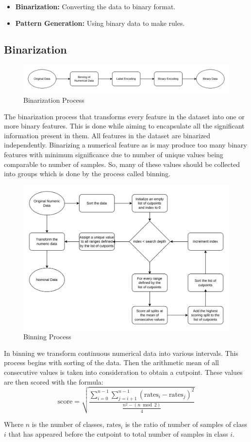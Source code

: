 \documentclass[pdflatex,sn-mathphys-num]{sn-jnl}%
\let\oldcaption\caption
\renewcommand{\caption}[1]{\oldcaption{\centering #1}}
\theoremstyle{thmstyleone}%
\theoremstyle{thmstyletwo}%
\theoremstyle{thmstylethree}%
\begin{document}
\begin{itemize}
    \item \textbf{Binarization:} Converting the data to binary format.
    \item \textbf{Pattern Generation:} Using binary data to make rules.
\end{itemize}


\subsection{Binarization}

\begin{figure}[ht!]
    \centering
    \includegraphics[width=\linewidth]{Binarization.drawio.png}
    \caption{Binarization Process}
    \label{fig:Binarization}
\end{figure}

The binarization process that transforms every feature in the dataset into one or more binary features.
This is done while aiming to encapsulate all the significant information present in them.
All features in the dataset are binarized independently.
Binarizing a numerical feature as is may produce too many binary features with minimum significance due to number of unique values being comparable to number of samples.
So, many of these values should be collected into groups which is done by the process called binning.

\begin{figure}[ht!]
    \centering
    \includegraphics[width=0.5\linewidth]{Binning.drawio.png}
    \caption{Binning Process}
    \label{fig:Binning}
\end{figure}

In binning we transform continuous numerical data into various intervals.
This process begins with sorting of the data.
Then the arithmetic mean of all consecutive values is taken into consideration to obtain a cutpoint.
These values are then scored with the formula:
\[
\text{score} = \sqrt{\frac{\sum_{i=0}^{n-1} \sum_{j=i+1}^{n-1} (\text{rates}_i - \text{rates}_j)^2}{\frac{n^2 - (n \bmod 2)}{4}}}
\]
\begin{center}
\footnotesize{Where \(n\) is the number of classes, \(\text{rates}_i\) is the ratio of number of samples of class \(i\) that has appeared before the cutpoint to total number of samples in class \(i\).}
\end{center}
\end{document}

